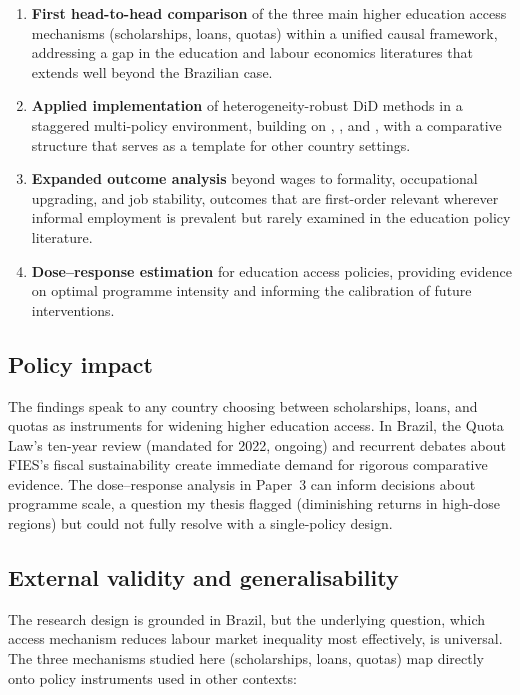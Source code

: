 \documentclass[a4paper,11pt]{article}
\begin{document}
\begin{enumerate}[nosep]
    \item \textbf{First head-to-head comparison} of the three main higher education access mechanisms (scholarships, loans, quotas) within a unified causal framework, addressing a gap in the education and labour economics literatures that extends well beyond the Brazilian case.
    \item \textbf{Applied implementation} of heterogeneity-robust DiD methods in a staggered multi-policy environment, building on \citet{callaway2021}, \citet{dechaisemartin2020}, and \citet{sun2021}, with a comparative structure that serves as a template for other country settings.
    \item \textbf{Expanded outcome analysis} beyond wages to formality, occupational upgrading, and job stability, outcomes that are first-order relevant wherever informal employment is prevalent but rarely examined in the education policy literature.
    \item \textbf{Dose--response estimation} for education access policies, providing evidence on optimal programme intensity and informing the calibration of future interventions.
\end{enumerate}

\subsection{Policy impact}

The findings speak to any country choosing between scholarships, loans, and quotas as instruments for widening higher education access. In Brazil, the Quota Law's ten-year review (mandated for 2022, ongoing) and recurrent debates about FIES's fiscal sustainability create immediate demand for rigorous comparative evidence. The dose--response analysis in Paper~3 can inform decisions about programme scale, a question my thesis flagged (diminishing returns in high-dose regions) but could not fully resolve with a single-policy design.

\subsection{External validity and generalisability}

The research design is grounded in Brazil, but the underlying question, which access mechanism reduces labour market inequality most effectively, is universal. The three mechanisms studied here (scholarships, loans, quotas) map directly onto policy instruments used in other contexts:
\end{document}
